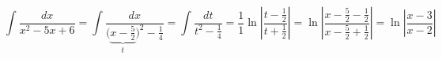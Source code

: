 \documentclass[../rgr1.tex]{subfiles}
\begin{document}
\Solution

\begin{dmath}
	\int \frac{dx}{x^2-5x+6} =
	\int \frac{dx}{\Big(\underbrace{x-\frac{5}{2}}_t\Big)^2-\frac{1}{4}} =
	\int \frac{dt}{t^2-\frac{1}{4}} =
	\frac{1}{1} \ln \left|\frac{t-\frac{1}{2}}{t+\frac{1}{2}}\right| =
	\ln \left|\frac{x-\frac{5}{2}-\frac{1}{2}}{x-\frac{5}{2}+\frac{1}{2}}\right| =
	\ln \left|\frac{x-3}{x-2}\right|
\end{dmath}

\end{document}
